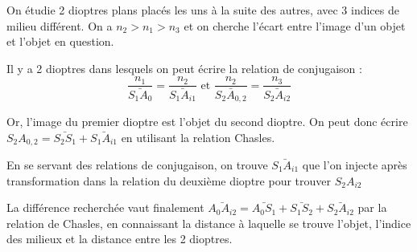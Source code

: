 \documentclass[french]{yLectureNote}
\begin{document}
On étudie 2 dioptres plans placés les uns à la suite des autres, avec 3 indices de milieu différent. On a $n_2>n_1>n_3$ et on cherche l'écart entre l'image d'un objet et l'objet en question.

Il y a 2 dioptres dans lesquels on peut écrire la relation de conjugaison :
\[\frac{n_1}{\bar{S_1A_0}} = \frac{n_2}{\bar{S_1A_{i1}}} \text{ et } \frac{n_2}{\bar{S_2A_{0,2}}} = \frac{n_3}{\bar{S_2A_{i2}}}\]

Or, l'image du premier dioptre est l'objet du second dioptre. On peut donc écrire $S_2A_{0,2} = \bar{S_2S_1} + \bar{S_1A_{i1}}$ en utilisant la relation Chasles.

En se servant des relations de conjugaison, on trouve $\bar{S_1A_{i1}}$ que l'on injecte après transformation dans la relation du deuxième dioptre pour trouver $S_2A_{i2}$

La différence recherchée vaut finalement $\bar{A_0A_{i2}} = \bar{A_0S_1} + \bar{S_1S_2} + \bar{S_2A_{i2}}$ par la relation de Chasles, en connaissant la distance à laquelle se trouve l'objet, l'indice des milieux et la distance entre les 2 dioptres.
\end{document}
